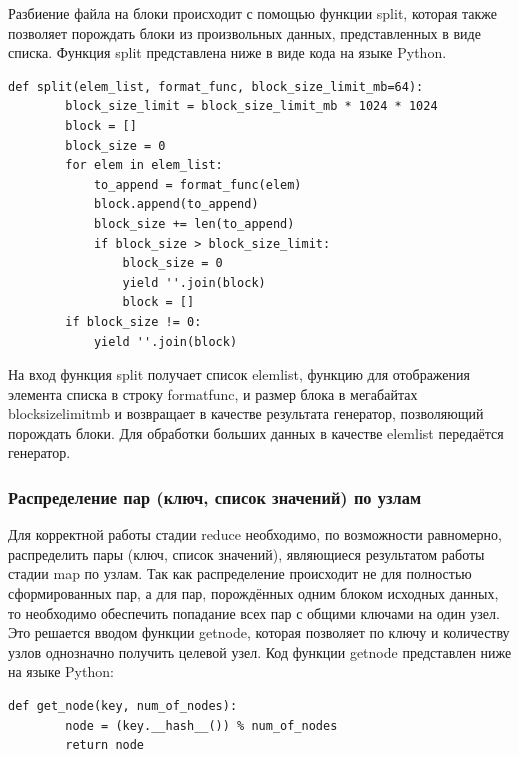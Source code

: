 \documentclass[12pt,a4paper,oneside]{extarticle}
\begin{document}
            Разбиение файла на блоки происходит с помощью функции split, которая также позволяет порождать блоки из произвольных данных, представленных в виде списка. Функция split представлена ниже в виде кода на языке Python.

            \lstset{language=Python}
            \begin{lstlisting}[mathescape]
    def split(elem_list, format_func, block_size_limit_mb=64):
        block_size_limit = block_size_limit_mb * 1024 * 1024
        block = []
        block_size = 0
        for elem in elem_list:
            to_append = format_func(elem)       
            block.append(to_append)
            block_size += len(to_append)
            if block_size > block_size_limit:            
                block_size = 0
                yield ''.join(block)
                block = []
        if block_size != 0:
            yield ''.join(block)
            \end{lstlisting}

            На вход функция split получает список elem\textunderscore list, функцию для отображения элемента списка в строку format\textunderscore func, и размер блока в мегабайтах block\textunderscore size\textunderscore limit\textunderscore mb и возвращает в качестве результата генератор, позволяющий порождать блоки. Для обработки больших данных в качестве elem\textunderscore list передаётся генератор.

        \subsubsection{Распределение пар (ключ, список значений) по узлам}
            Для корректной работы стадии reduce необходимо, по возможности равномерно, распределить пары (ключ, список значений), являющиеся результатом работы стадии map по узлам. Так как распределение происходит не для полностью сформированных пар, а для пар, порождённых одним блоком исходных данных, то необходимо обеспечить попадание всех пар с общими ключами на один узел. Это решается вводом функции get\textunderscore node, которая позволяет по ключу и количеству узлов однозначно получить целевой узел. Код функции get\textunderscore node представлен ниже на языке Python:

            \lstset{language=Python}
            \begin{lstlisting}[mathescape] 
    def get_node(key, num_of_nodes):
        node = (key.__hash__()) % num_of_nodes
        return node
            \end{lstlisting}
\end{document}
